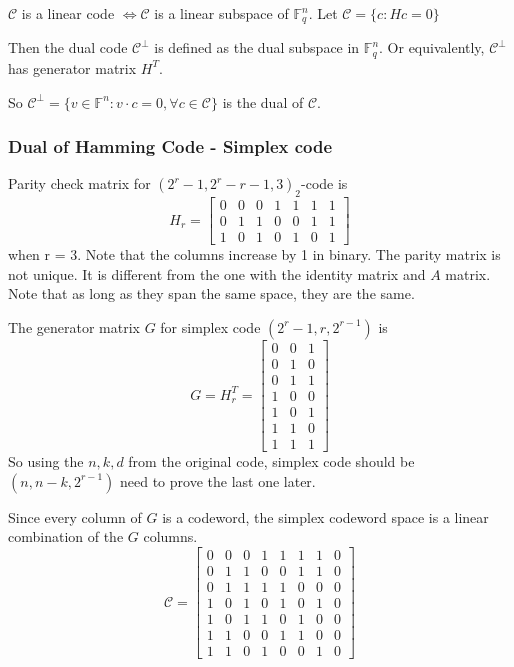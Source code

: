 \documentclass[letterpaper,12pt]{article}
\begin{document}
$\mathcal{C}$ is a linear code  $\iff \mathcal{C}$ is a linear subspace of $\mathbb{F}_q^n$. Let $\mathcal{C} = \{c:Hc=0\}$

Then the dual code $\mathcal{C}^{\perp}$ is defined as the dual subspace in
$\mathbb{F}_q^n$. Or equivalently, $\mathcal{C}^{\perp}$ has generator matrix
$H^T$.

So $\mathcal{C}^{\perp}=\{v\in \mathbb{F}^n: v\cdot c=0, \forall c\in
    \mathcal{C}\}$ is the dual of $\mathcal{C}$.
\subsubsection{Dual of Hamming Code - Simplex code}
Parity check matrix for $(2^r-1,2^r-r-1,3)_2$-code is \[H_r=\begin{bmatrix}
        0 & 0 & 0 & 1 & 1 & 1 & 1 \\
        0 & 1 & 1 & 0 & 0 & 1 & 1 \\
        1 & 0 & 1 & 0 & 1 & 0 & 1
    \end{bmatrix}\] when r = 3. Note that the columns increase by 1 in binary. The parity matrix is
not unique. It is different from the one with the identity matrix and $A$
matrix. Note that as long as they span the same space, they are the same.

The generator matrix $G$ for simplex code $(2^r-1, r, 2^{r-1})$ is
\[G=H_r^T = \begin{bmatrix}
        0 & 0 & 1 \\
        0 & 1 & 0 \\
        0 & 1 & 1 \\
        1 & 0 & 0 \\
        1 & 0 & 1 \\
        1 & 1 & 0 \\
        1 & 1 & 1
    \end{bmatrix}\]
So using the $n,k,d$ from the original code, simplex code should be $(n,
    n-k,2^{r-1})$ need to prove the last one later.

Since every column of $G$ is a codeword, the simplex codeword space is a linear
combination of the $G$ columns. \[\mathcal{C}= \begin{bmatrix}
        0 & 0 & 0 & 1 & 1 & 1 & 1 & 0 \\
        0 & 1 & 1 & 0 & 0 & 1 & 1 & 0 \\
        0 & 1 & 1 & 1 & 1 & 0 & 0 & 0 \\
        1 & 0 & 1 & 0 & 1 & 0 & 1 & 0 \\
        1 & 0 & 1 & 1 & 0 & 1 & 0 & 0 \\
        1 & 1 & 0 & 0 & 1 & 1 & 0 & 0 \\
        1 & 1 & 0 & 1 & 0 & 0 & 1 & 0
    \end{bmatrix}\]
\end{document}
